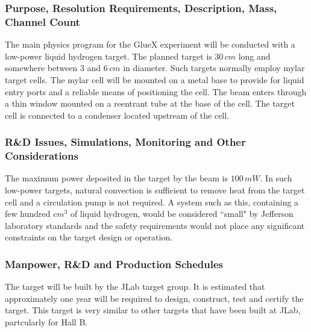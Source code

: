 \subsubsection*{Purpose, Resolution Requirements, Description, Mass, Channel Count}
The main physics program for the GlueX experiment will be conducted with a
low-power liquid hydrogen target. The planned target is $30\, cm$ long and
somewhere between $3$ and $6\, cm$ in diameter. Such targets normally 
employ mylar target cells. The mylar cell will be mounted on a metal base 
to provide for liquid entry ports and a reliable means of positioning the 
cell. The beam enters through a thin window mounted on a reentrant tube at 
the base of the cell. The target cell is connected to a condenser located 
upstream of the cell.

\subsubsection*{R\&D Issues, Simulations, Monitoring and Other Considerations}
The maximum power deposited in the target by the beam is $100\, mW$.  In such low-power
targets, natural convection is sufficient to remove heat from the target cell and a
circulation pump is not required. A system such as this, containing a few hundred 
$cm^3$ of liquid hydrogen, would be considered ``small" by Jefferson laboratory standards
and the safety requirements would not place any significant constraints on the target
design or operation.

\subsubsection*{Manpower, R\&D and Production Schedules}
The target will be built by the JLab target group. It is estimated that
approximately one year will be required to design, construct, test and
certify the target. This target is very similar to other targets that
have been built at JLab, partcularly for Hall B.

